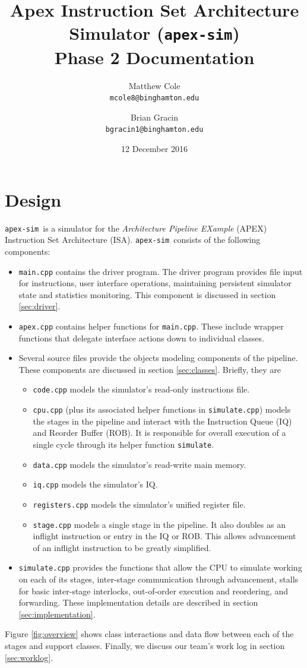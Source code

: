 \documentclass[12pt]{article}
\title{Apex Instruction Set Architecture Simulator (\texttt{apex-sim}) \\ Phase 2 Documentation}
\author{Matthew Cole \\ \texttt{mcole8@binghamton.edu}
\and
Brian Gracin \\ \texttt{bgracin1@binghamton.edu}}
\date{12 December 2016}
\newcommand{\codename}[0]{\texttt{apex-sim}~}
\begin{document}
\maketitle
\tableofcontents
\newpage
\listoffigures
\listoftables
\newpage
{}


\section{Design}
\codename is a simulator for the \textit{Architecture Pipeline EXample} (APEX) Instruction Set Architecture (ISA).
\codename consists of the following components:
\begin{itemize}
  \item \texttt{main.cpp} contains the driver program. The driver program provides file input for instructions, user interface operations, maintaining persistent simulator state and statistics monitoring. This component is discussed in section \ref{sec:driver}.
  \item \texttt{apex.cpp} contains helper functions for \texttt{main.cpp}. These include wrapper functions that delegate interface actions down to individual classes.
  \item Several source files provide the objects modeling components of the pipeline. These components are discussed in section \ref{sec:classes}. Briefly, they are
	\begin{itemize}
		\item \texttt{code.cpp} models the simulator's read-only instructions file.
		\item \texttt{cpu.cpp} (plus its associated helper functions in \texttt{simulate.cpp}) models the stages in the pipeline and interact with the Instruction Queue (IQ) and Reorder Buffer (ROB). It is responsible for overall execution of a single cycle through its helper function \texttt{simulate}. 
		\item \texttt{data.cpp} models the simulator's read-write main memory.
		\item \texttt{iq.cpp} models the simulator's IQ.
		\item \texttt{registers.cpp} models the simulator's unified register file.
		\item \texttt{stage.cpp} models a single stage in the pipeline. It also doubles as an inflight instruction or entry in the IQ or ROB. This allows advancement of an inflight instruction to be greatly simplified.
	\end{itemize}
	\item \texttt{simulate.cpp} provides the functions that allow the CPU to simulate working on each of its stages, inter-stage communication through advancement, stalls for basic inter-stage interlocks, out-of-order execution and reordering, and forwarding. These implementation details are described in section \ref{sec:implementation}.
\end{itemize}
Figure \ref{fig:overview} shows class interactions and data flow between each of the stages and support classes.
Finally, we discuss our team's work log in section \ref{sec:worklog}.
\end{document}
